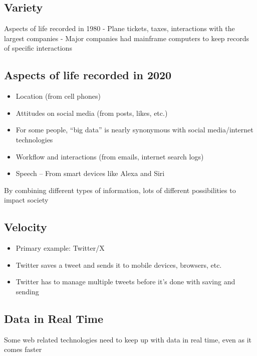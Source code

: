 \documentclass[
]{book}
\providecommand{\tightlist}{%
  \setlength{\itemsep}{0pt}\setlength{\parskip}{0pt}}
\begin{document}
\subsection{Variety}\label{variety}

Aspects of life recorded in 1980
- Plane tickets, taxes, interactions with the largest companies
- Major companies had mainframe computers to keep records of specific interactions

\subsection{Aspects of life recorded in 2020}\label{aspects-of-life-recorded-in-2020}

\begin{itemize}
\tightlist
\item
  Location (from cell phones)
\item
  Attitudes on social media (from posts, likes, etc.)
\item
  For some people, ``big data'' is nearly synonymous with social media/internet technologies
\item
  Workflow and interactions (from emails, internet search logs)
\item
  Speech -- From smart devices like Alexa and Siri
\end{itemize}

By combining different types of information, lots of different possibilities to impact society

\subsection{Velocity}\label{velocity}

\begin{itemize}
\tightlist
\item
  Primary example: Twitter/X
\item
  Twitter saves a tweet and sends it to mobile devices, browsers, etc.
\item
  Twitter has to manage multiple tweets before it's done with saving and sending
\end{itemize}

\subsection{Data in Real Time}\label{data-in-real-time}

Some web related technologies need to keep up with data in real time, even as it comes faster
\end{document}

